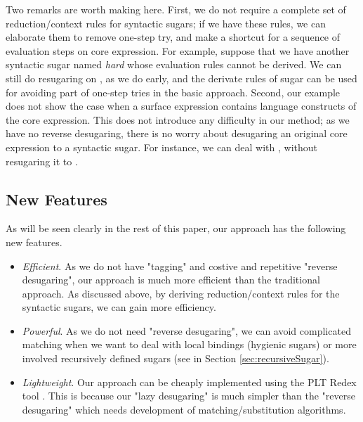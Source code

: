 Two remarks are worth making here. First, we do not require a complete set of reduction/context rules for syntactic sugars; if we have these rules, we can elaborate them to remove one-step try, and make a shortcut for a sequence of evaluation steps on core expression.
For example, suppose that we have another syntactic sugar named \emph{hard} whose evaluation rules cannot be derived.
We can still do resugaring on , as we do early, and the derivate rules of  sugar can be used for avoiding part of one-step tries in the basic approach.
Second, our example does not show the case when a surface expression contains language constructs of the core expression. This does not introduce any difficulty in our method; as we have no reverse desugaring, there is no worry about desugaring an original core expression to a syntactic sugar. For instance, we can deal with , without resugaring it to .


\subsection{New Features}

As will be seen clearly in the rest of this paper, our approach has the following new features.
\begin{itemize}
  \item {\em Efficient}. As we do not have "tagging" and costive and repetitive "reverse desugaring", our approach is much more efficient than the traditional approach. As discussed above, by deriving reduction/context rules for the syntactic sugars, we can gain more efficiency.

  \item {\em Powerful}. As we do not need "reverse desugaring", we can avoid complicated matching when we want to deal with local bindings (hygienic sugars) or more involved recursively defined sugars (see  in Section \ref{sec:recursiveSugar}).

  \item {\em Lightweight}. Our approach can be cheaply implemented using the PLT Redex tool \cite{SEwPR}. This is because our "lazy desugaring" is much simpler than the "reverse desugaring" which needs development of matching/substitution algorithms.

\end{itemize}
